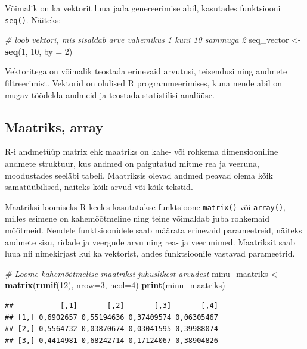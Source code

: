 \documentclass[
]{book}
\newenvironment{Shaded}{\begin{snugshade}}{\end{snugshade}}
\newcommand{\AttributeTok}[1]{\textcolor[rgb]{0.13,0.29,0.53}{#1}}
\newcommand{\CommentTok}[1]{\textcolor[rgb]{0.56,0.35,0.01}{\textit{#1}}}
\newcommand{\DecValTok}[1]{\textcolor[rgb]{0.00,0.00,0.81}{#1}}
\newcommand{\FunctionTok}[1]{\textcolor[rgb]{0.13,0.29,0.53}{\textbf{#1}}}
\newcommand{\NormalTok}[1]{#1}
\newcommand{\OtherTok}[1]{\textcolor[rgb]{0.56,0.35,0.01}{#1}}
\renewenvironment{Shaded} {\begin{snugshade}\footnotesize} {\end{snugshade}}
\begin{document}
Võimalik on ka vektorit luua jada genereerimise abil, kasutades funktsiooni \texttt{seq()}. Näiteks:

\begin{Shaded}
\begin{Highlighting}[]
\CommentTok{\# loob vektori, mis sisaldab arve vahemikus 1 kuni 10 sammuga 2}
\NormalTok{seq\_vector }\OtherTok{\textless{}{-}} \FunctionTok{seq}\NormalTok{(}\DecValTok{1}\NormalTok{, }\DecValTok{10}\NormalTok{, }\AttributeTok{by =} \DecValTok{2}\NormalTok{) }
\end{Highlighting}
\end{Shaded}

Vektoritega on võimalik teostada erinevaid arvutusi, teisendusi ning andmete filtreerimist. Vektorid on olulised R programmeerimises, kuna nende abil on mugav töödelda andmeid ja teostada statistilisi analüüse.

\subsection{Maatriks, array}\label{maatriks-array}

R-i andmetüüp matrix ehk maatriks on kahe- või rohkema dimensiooniline andmete struktuur, kus andmed on paigutatud mitme rea ja veeruna, moodustades seeläbi tabeli. Maatriksis olevad andmed peavad olema kõik samatüübilised, näiteks kõik arvud või kõik tekstid.

Maatriksi loomiseks R-keeles kasutatakse funktsioone \texttt{matrix()} või \texttt{array()}, milles esimene on kahemõõtmeline ning teine võimaldab juba rohkemaid mõõtmeid. Nendele funktsioonidele saab määrata erinevaid parameetreid, näiteks andmete sisu, ridade ja veergude arvu ning rea- ja veerunimed. Maatriksit saab luua nii nimekirjast kui ka vektorist, andes funktsioonile vastavad parameetrid.

\begin{Shaded}
\begin{Highlighting}[]
\CommentTok{\# Loome kahemõõtmelise maatriksi juhuslikest arvudest}
\NormalTok{minu\_maatriks }\OtherTok{\textless{}{-}} \FunctionTok{matrix}\NormalTok{(}\FunctionTok{runif}\NormalTok{(}\DecValTok{12}\NormalTok{), }\AttributeTok{nrow=}\DecValTok{3}\NormalTok{, }\AttributeTok{ncol=}\DecValTok{4}\NormalTok{)}
\FunctionTok{print}\NormalTok{(minu\_maatriks)}
\end{Highlighting}
\end{Shaded}

\begin{verbatim}
##           [,1]       [,2]       [,3]       [,4]
## [1,] 0,6902657 0,55194636 0,37409574 0,06305467
## [2,] 0,5564732 0,03870674 0,03041595 0,39988074
## [3,] 0,4414981 0,68242714 0,17124067 0,38904826
\end{verbatim}
\end{document}
